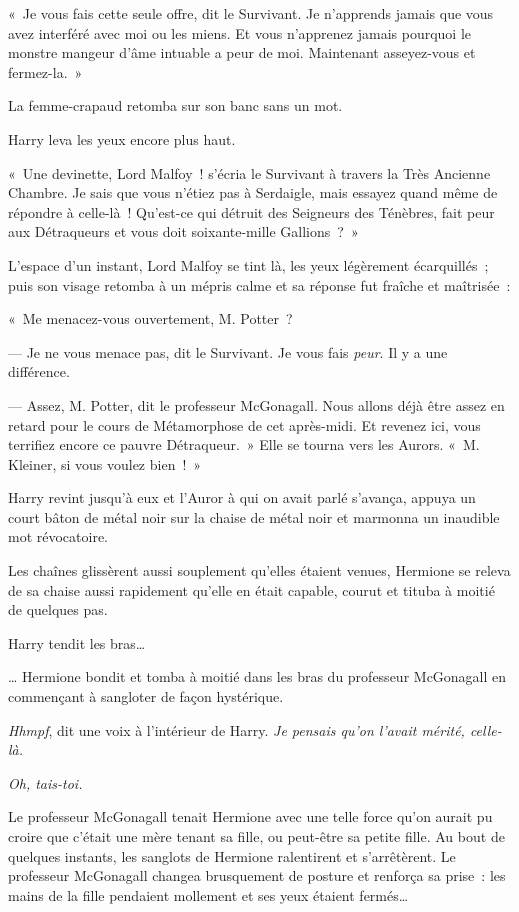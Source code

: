 «~Je vous fais cette seule offre, dit le Survivant.
Je n'apprends jamais que vous avez interféré avec moi ou les miens.
Et vous n'apprenez jamais pourquoi le monstre mangeur d'âme intuable a peur de moi.
Maintenant asseyez-vous et fermez-la.~»

La femme-crapaud retomba sur son banc sans un mot.

Harry leva les yeux encore plus haut.

«~Une devinette, Lord Malfoy~! s'écria le Survivant à travers la Très Ancienne Chambre.
Je sais que vous n'étiez pas à Serdaigle, mais essayez quand même de répondre à celle-là~!
Qu'est-ce qui détruit des Seigneurs des Ténèbres, fait peur aux Détraqueurs et vous doit soixante-mille Gallions~?~»

L'espace d'un instant, Lord Malfoy se tint là, les yeux légèrement écarquillés~; puis son visage retomba à un mépris calme et sa réponse fut fraîche et maîtrisée~:

«~Me menacez-vous ouvertement, M. Potter~?

--- Je ne vous menace pas, dit le Survivant.
Je vous fais \emph{peur}.
Il y a une différence.

--- Assez, M. Potter, dit le professeur McGonagall.
Nous allons déjà être assez en retard pour le cours de Métamorphose de cet après-midi.
Et revenez ici, vous terrifiez encore ce pauvre Détraqueur.~»
Elle se tourna vers les Aurors.
«~M. Kleiner, si vous voulez bien~!~»

Harry revint jusqu'à eux et l'Auror à qui on avait parlé s'avança, appuya un court bâton de métal noir sur la chaise de métal noir et marmonna un inaudible mot révocatoire.

Les chaînes glissèrent aussi souplement qu'elles étaient venues, Hermione se releva de sa chaise aussi rapidement qu'elle en était capable, courut et tituba à moitié de quelques pas.

Harry tendit les bras…

… Hermione bondit et tomba à moitié dans les bras du professeur McGonagall en commençant à sangloter de façon hystérique.

\emph{Hhmpf}, dit une voix à l'intérieur de Harry.
\emph{Je pensais qu'on l'avait mérité, celle-là.}

\emph{Oh, tais-toi.}

Le professeur McGonagall tenait Hermione avec une telle force qu'on aurait pu croire que c'était une mère tenant sa fille, ou peut-être sa petite fille.
Au bout de quelques instants, les sanglots de Hermione ralentirent et s'arrêtèrent.
Le professeur McGonagall changea brusquement de posture et renforça sa prise~: les mains de la fille pendaient mollement et ses yeux étaient fermés…

